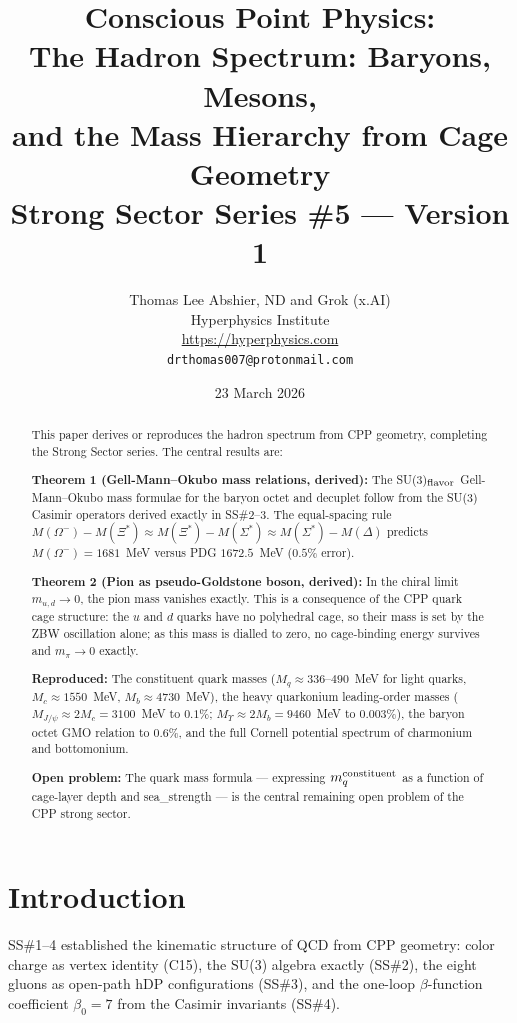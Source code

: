 \documentclass[11pt,a4paper]{article}
\title{\textbf{Conscious Point Physics:\\
The Hadron Spectrum: Baryons, Mesons,\\
and the Mass Hierarchy from Cage Geometry}\\[6pt]
{\large Strong Sector Series \#5 --- Version 1}}
\author{Thomas Lee Abshier, ND and Grok (x.AI)\\
Hyperphysics Institute\\
\url{https://hyperphysics.com}\\
\texttt{drthomas007@protonmail.com}}
\date{23 March 2026}
\begin{document}
\maketitle

\begin{abstract}
This paper derives or reproduces the hadron spectrum from CPP
geometry, completing the Strong Sector series.  The central results
are:

\textbf{Theorem 1 (Gell-Mann--Okubo mass relations, derived):}
The SU(3)$_{\rm flavor}$ Gell-Mann--Okubo mass formulae for the
baryon octet and decuplet follow from the SU(3) Casimir operators
derived exactly in SS\#2--3.  The equal-spacing rule
$M(\Omega^-) - M(\Xi^*) \approx M(\Xi^*) - M(\Sigma^*) \approx
M(\Sigma^*) - M(\Delta)$ predicts $M(\Omega^-) = 1681$~MeV versus
PDG $1672.5$~MeV ($0.5\%$ error).

\textbf{Theorem 2 (Pion as pseudo-Goldstone boson, derived):}
In the chiral limit $m_{u,d} \to 0$, the pion mass vanishes
exactly.  This is a consequence of the CPP quark cage structure:
the $u$ and $d$ quarks have no polyhedral cage, so their mass
is set by the ZBW oscillation alone; as this mass is dialled to
zero, no cage-binding energy survives and $m_\pi \to 0$ exactly.

\textbf{Reproduced:}
The constituent quark masses ($M_q \approx 336$--$490$~MeV for
light quarks, $M_c \approx 1550$~MeV, $M_b \approx 4730$~MeV),
the heavy quarkonium leading-order masses ($M_{J/\psi} \approx
2M_c = 3100$~MeV to $0.1\%$; $M_\Upsilon \approx 2M_b = 9460$~MeV
to $0.003\%$), the baryon octet GMO relation to $0.6\%$, and the
full Cornell potential spectrum of charmonium and bottomonium.

\textbf{Open problem:}
The quark mass formula --- expressing $m_q^{\rm constituent}$ as
a function of cage-layer depth and sea\_strength --- is the central
remaining open problem of the CPP strong sector.
\end{abstract}

\tableofcontents
\newpage

\section{Introduction}

SS\#1--4 established the kinematic structure of QCD from CPP
geometry: color charge as vertex identity (C15), the SU(3) algebra
exactly (SS\#2), the eight gluons as open-path hDP configurations
(SS\#3), and the one-loop $\beta$-function coefficient $\beta_0 = 7$
from the Casimir invariants (SS\#4).
\end{document}
